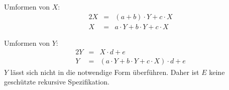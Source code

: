 \documentclass[10pt,a4paper,oneside,ngerman,numbers=noenddot]{scrartcl}
\begin{document}
\setcounter{section}{5}
\section{} %
    \subsection{}
    Umformen von \(X\):
    \begin{alignat*}{2}
        X &=& (a + b) \cdot Y + c \cdot X \\
        X &=& a \cdot Y + b \cdot Y + c \cdot X
    \end{alignat*}

    Umformen von \(Y\):
    \begin{alignat*}{2}
        Y &=& X \cdot d + e \\
        Y &=& (a \cdot Y + b \cdot Y + c \cdot X) \cdot d + e
    \end{alignat*}
    \(Y\) lässt sich nicht in die notwendige Form überführen. Daher ist \(E\) keine geschützte rekursive Spezifikation.
\end{document}
